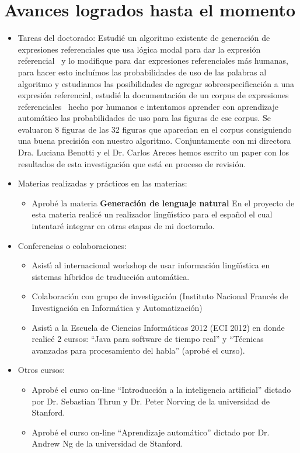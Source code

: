 \section{Avances logrados hasta el momento}
\label{progreso}

\begin{itemize}
\item Tareas del doctorado:
Estudi\'e un algoritmo existente de generaci\'on de expresiones referenciales que usa l\'ogica modal para dar la 
expresi\'on referencial~\cite{Areces2008} y lo modifique para dar expresiones referenciales m\'as humanas, para hacer 
esto inclu\'imos las probabilidades de uso de las palabras al algoritmo y estudiamos las posibilidades de agregar 
sobreespecificaci\'on a una expresi\'on referencial, estudi\'e la documentaci\'on de un corpus de expresiones 
referenciales~\cite{viethen-dale:2011:UCNLG+Eval} hecho por humanos e intentamos aprender con aprendizaje autom\'atico 
las probabilidades de uso para las figuras de ese corpus. Se evaluaron 8 figuras de las 32 figuras que aparec\'{\i}an en 
el corpus consiguiendo una buena precisi\'on con nuestro algoritmo. Conjuntamente con mi directora Dra. Luciana Benotti y el Dr. Carlos Areces hemos escrito un paper con los resultados de esta investigaci\'on que est\'a en proceso de revisi\'on.

\item Materias realizadas y pr\'acticos en las materias:
\begin{itemize}
\item Aprob\'e la materia {\bf Generaci\'on de lenguaje natural} En el proyecto de esta materia realic\'e un realizador 
ling\"u\'{\i}stico para el espa\~{n}ol el cual intentar\'e integrar en otras etapas de mi doctorado.
\end{itemize}
\item Conferencias o colaboraciones:
\begin{itemize}
\item Asist\'{\i} al internacional workshop de usar informaci\'on ling\"u\'{\i}stica en sistemas h\'{i}bridos de traducci\'on autom\'atica.
\item Colaboraci\'on con grupo de investigaci\'on (Instituto Nacional Franc\'es de Investigaci\'on en Inform\'atica y Automatizaci\'on)
\item Asist\'{\i} a la Escuela de Ciencias Inform\'aticas 2012 (ECI 2012) en donde realic\'e 2 cursos: ``Java para software de tiempo real'' 
y ``T\'ecnicas avanzadas para procesamiento del habla'' (aprob\'e el curso).
\end{itemize}
\item Otros cursos:
\begin{itemize}
\item Aprob\'e el curso on-line ``Introducci\'on a la inteligencia artificial'' dictado por Dr. Sebastian Thrun y Dr. Peter Norving de la 
universidad de Stanford.
\item Aprob\'e el curso on-line ``Aprendizaje autom\'atico'' dictado por Dr. Andrew Ng de la universidad de Stanford. 
\end{itemize}

\end{itemize}




